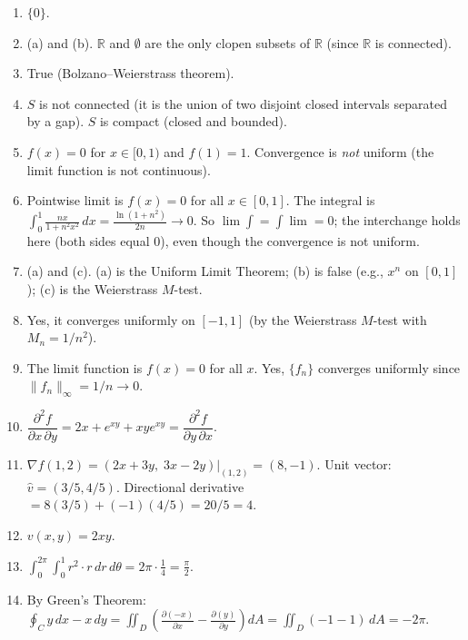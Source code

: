 \documentclass[11pt]{article}
\begin{document}
\begin{enumerate}
\item $\{0\}$.

\item (a) and (b). \quad $\mathbb{R}$ and $\emptyset$ are the only clopen subsets of $\mathbb{R}$ (since $\mathbb{R}$ is connected).

\item True (Bolzano--Weierstrass theorem).

\item $S$ is not connected (it is the union of two disjoint closed intervals separated by a gap). $S$ is compact (closed and bounded).

\item $f(x) = 0$ for $x\in[0,1)$ and $f(1) = 1$. Convergence is \emph{not} uniform (the limit function is not continuous).

\item Pointwise limit is $f(x) = 0$ for all $x\in[0,1]$. The integral is $\int_0^1 \frac{nx}{1+n^2x^2}\,dx = \frac{\ln(1+n^2)}{2n} \to 0$. So $\lim\int = \int\lim = 0$; the interchange holds here (both sides equal $0$), even though the convergence is not uniform.

\item (a) and (c). \quad (a) is the Uniform Limit Theorem; (b) is false (e.g., $x^n$ on $[0,1]$); (c) is the Weierstrass $M$-test.

\item Yes, it converges uniformly on $[-1,1]$ (by the Weierstrass $M$-test with $M_n = 1/n^2$).

\item The limit function is $f(x) = 0$ for all $x$. Yes, $\{f_n\}$ converges uniformly since $\|f_n\|_\infty = 1/n \to 0$.

\item $\dfrac{\partial^2 f}{\partial x\,\partial y} = 2x + e^{xy} + xye^{xy} = \dfrac{\partial^2 f}{\partial y\,\partial x}$.

\item $\nabla f(1,2) = (2x+3y,\; 3x-2y)\big|_{(1,2)} = (8, -1)$. Unit vector: $\hat{v} = (3/5, 4/5)$. Directional derivative $= 8(3/5) + (-1)(4/5) = 20/5 = 4$.

\item $v(x,y) = 2xy$.

\item $\displaystyle\int_0^{2\pi}\int_0^1 r^2 \cdot r\,dr\,d\theta = 2\pi\cdot\frac{1}{4} = \frac{\pi}{2}$.

\item By Green's Theorem: $\displaystyle\oint_C y\,dx - x\,dy = \iint_D\left(\frac{\partial(-x)}{\partial x} - \frac{\partial(y)}{\partial y}\right)dA = \iint_D (-1-1)\,dA = -2\pi$.
\end{enumerate}
\end{document}
